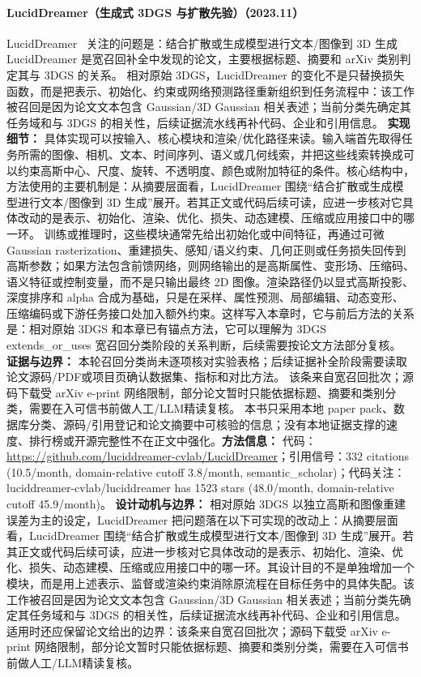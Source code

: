 \paragraph{LucidDreamer（生成式 3DGS 与扩散先验）（2023.11）}
LucidDreamer~\cite{2311_11284} 关注的问题是：结合扩散或生成模型进行文本/图像到 3D 生成 LucidDreamer 是宽召回补全中发现的论文，主要根据标题、摘要和 arXiv 类别判定其与 3DGS 的关系。
相对原始 3DGS，LucidDreamer 的变化不是只替换损失函数，而是把表示、初始化、约束或网络预测路径重新组织到任务流程中：该工作被召回是因为论文文本包含 Gaussian/3D Gaussian 相关表述；当前分类先确定其任务域和与 3DGS 的相关性，后续证据流水线再补代码、企业和引用信息。
\textbf{实现细节：} 具体实现可以按输入、核心模块和渲染/优化路径来读。输入端首先取得任务所需的图像、相机、文本、时间序列、语义或几何线索，并把这些线索转换成可以约束高斯中心、尺度、旋转、不透明度、颜色或附加特征的条件。核心结构中，方法使用的主要机制是：从摘要层面看，LucidDreamer 围绕“结合扩散或生成模型进行文本/图像到 3D 生成”展开。若其正文或代码后续可读，应进一步核对它具体改动的是表示、初始化、渲染、优化、损失、动态建模、压缩或应用接口中的哪一环。 训练或推理时，这些模块通常先给出初始化或中间特征，再通过可微 Gaussian rasterization、重建损失、感知/语义约束、几何正则或任务损失回传到高斯参数；如果方法包含前馈网络，则网络输出的是高斯属性、变形场、压缩码、语义特征或控制变量，而不是只输出最终 2D 图像。渲染路径仍以显式高斯投影、深度排序和 alpha 合成为基础，只是在采样、属性预测、局部编辑、动态变形、压缩编码或下游任务接口处加入额外约束。这样写入本章时，它与前后方法的关系是：相对原始 3DGS 和本章已有锚点方法，它可以理解为 3DGS extends\_or\_uses 宽召回分类阶段的关系判断，后续需要按论文方法部分复核。
\textbf{证据与边界：} 本轮召回分类尚未逐项核对实验表格；后续证据补全阶段需要读取论文源码/PDF或项目页确认数据集、指标和对比方法。 该条来自宽召回批次；源码下载受 arXiv e-print 网络限制，部分论文暂时只能依据标题、摘要和类别分类，需要在入可信书前做人工/LLM精读复核。 本书只采用本地 paper pack、数据库分类、源码/引用登记和论文摘要中可核验的信息；没有本地证据支撑的速度、排行榜或开源完整性不在正文中强化。\textbf{方法信息：} 代码：\url{https://github.com/luciddreamer-cvlab/LucidDreamer}；引用信号：332 citations (10.5/month, domain-relative cutoff 3.8/month, semantic\_scholar)；代码关注：luciddreamer-cvlab/luciddreamer has 1523 stars (48.0/month, domain-relative cutoff 45.9/month)。
\textbf{设计动机与边界：} 相对原始 3DGS 以独立高斯和图像重建误差为主的设定，LucidDreamer 把问题落在以下可实现的改动上：从摘要层面看，LucidDreamer 围绕“结合扩散或生成模型进行文本/图像到 3D 生成”展开。若其正文或代码后续可读，应进一步核对它具体改动的是表示、初始化、渲染、优化、损失、动态建模、压缩或应用接口中的哪一环。其设计目的不是单独增加一个模块，而是用上述表示、监督或渲染约束消除原流程在目标任务中的具体失配。该工作被召回是因为论文文本包含 Gaussian/3D Gaussian 相关表述；当前分类先确定其任务域和与 3DGS 的相关性，后续证据流水线再补代码、企业和引用信息。适用时还应保留论文给出的边界：该条来自宽召回批次；源码下载受 arXiv e-print 网络限制，部分论文暂时只能依据标题、摘要和类别分类，需要在入可信书前做人工/LLM精读复核。
